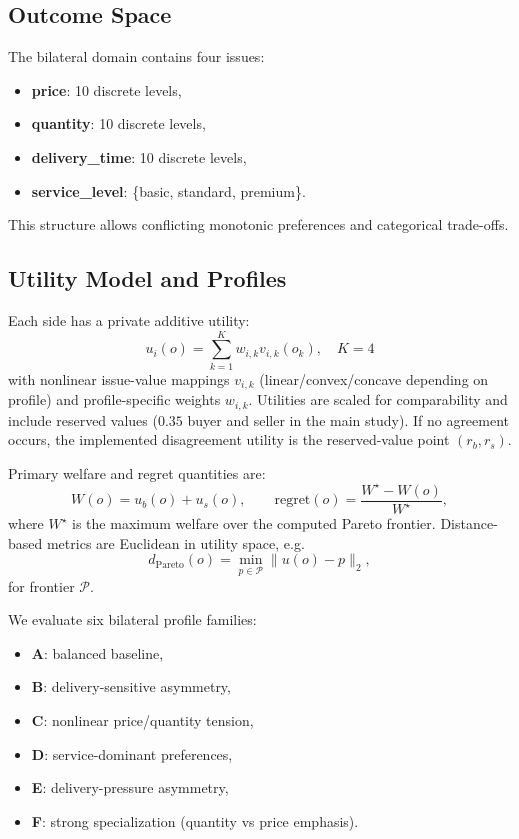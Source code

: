\documentclass[11pt]{article}
\begin{document}
\subsection{Outcome Space}
The bilateral domain contains four issues:
\begin{itemize}[leftmargin=1.5em]
    \item \textbf{price}: 10 discrete levels,
    \item \textbf{quantity}: 10 discrete levels,
    \item \textbf{delivery\_time}: 10 discrete levels,
    \item \textbf{service\_level}: \{basic, standard, premium\}.
\end{itemize}
This structure allows conflicting monotonic preferences and categorical trade-offs.

\subsection{Utility Model and Profiles}
Each side has a private additive utility:
\[
u_i(o)=\sum_{k=1}^{K} w_{i,k} v_{i,k}(o_k), \quad K=4
\]
with nonlinear issue-value mappings \(v_{i,k}\) (linear/convex/concave depending on profile) and profile-specific weights \(w_{i,k}\). Utilities are scaled for comparability and include reserved values (\(0.35\) buyer and seller in the main study). If no agreement occurs, the implemented disagreement utility is the reserved-value point \((r_b,r_s)\).

Primary welfare and regret quantities are:
\[
W(o)=u_b(o)+u_s(o), \qquad
\text{regret}(o)=\frac{W^\star - W(o)}{W^\star},
\]
where \(W^\star\) is the maximum welfare over the computed Pareto frontier. Distance-based metrics are Euclidean in utility space, e.g.
\[
d_{\text{Pareto}}(o)=\min_{p \in \mathcal{P}} \lVert u(o)-p \rVert_2,
\]
for frontier \(\mathcal{P}\).

We evaluate six bilateral profile families:
\begin{itemize}[leftmargin=1.5em]
    \item \textbf{A}: balanced baseline,
    \item \textbf{B}: delivery-sensitive asymmetry,
    \item \textbf{C}: nonlinear price/quantity tension,
    \item \textbf{D}: service-dominant preferences,
    \item \textbf{E}: delivery-pressure asymmetry,
    \item \textbf{F}: strong specialization (quantity vs price emphasis).
\end{itemize}
\end{document}
